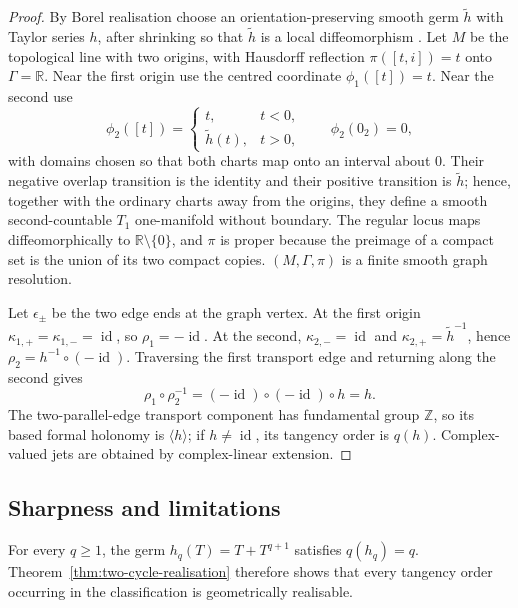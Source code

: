 \documentclass[11pt]{article}
\theoremstyle{plain}
\theoremstyle{definition}
\begin{document}
\begin{proof}
By Borel realisation choose an orientation-preserving smooth germ \(\widetilde h\) with Taylor series \(h\), after shrinking so that \(\widetilde h\) is a local diffeomorphism \citep{Borel1895,Hormander2003AnalysisI}. Let \(M\) be the topological line with two origins, with Hausdorff reflection \(\pi([t,i])=t\) onto \(\Gamma=\mathbb R\). Near the first origin use the centred coordinate \(\phi_1([t])=t\). Near the second use
\[
 \phi_2([t])=
 \begin{cases}
 t,&t<0,\\
 \widetilde h(t),&t>0,
 \end{cases}
 \qquad \phi_2(0_2)=0,
\]
with domains chosen so that both charts map onto an interval about \(0\). Their negative overlap transition is the identity and their positive transition is \(\widetilde h\); hence, together with the ordinary charts away from the origins, they define a smooth second-countable \(T_1\) one-manifold without boundary. The regular locus maps diffeomorphically to \(\mathbb R\setminus\{0\}\), and \(\pi\) is proper because the preimage of a compact set is the union of its two compact copies. \((M,\Gamma,\pi)\) is a finite smooth graph resolution.

Let \(\epsilon_\pm\) be the two edge ends at the graph vertex. At the first origin \(\kappa_{1,+}=\kappa_{1,-}=\operatorname{id}\), so \(\rho_1=-\operatorname{id}\). At the second, \(\kappa_{2,-}=\operatorname{id}\) and \(\kappa_{2,+}=\widetilde h^{-1}\), hence \(\rho_2=h^{-1}\circ(-\operatorname{id})\). Traversing the first transport edge and returning along the second gives
\[
 \rho_1\circ\rho_2^{-1}=(-\operatorname{id})\circ(-\operatorname{id})\circ h=h.
\]
The two-parallel-edge transport component has fundamental group \(\mathbb Z\), so its based formal holonomy is \(\langle h\rangle\); if \(h\ne\operatorname{id}\), its tangency order is \(q(h)\). Complex-valued jets are obtained by complex-linear extension.
\end{proof}

\subsection{Sharpness and limitations}
\label{subsec:holonomy-sharpness}

For every
\(q\geq1\),
the germ \(h_q(T) = T+T^{q+1}\) satisfies
\(q(h_q)=q\).
Theorem~\ref{thm:two-cycle-realisation}
therefore shows that every tangency order occurring in the
classification is geometrically realisable.
\end{document}
